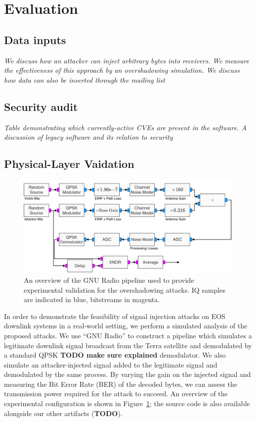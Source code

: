 \section{Evaluation}\label{sec:evaluation}

\subsection{Data inputs}

\textit{We discuss how an attacker can inject arbitrary bytes into receivers.  We measure the effectiveness of this approach by an overshadowing simulation.  We discuss how data can also be inserted through the mailing list}

\subsection{Security audit}
\textit{Table demonstrating which currently-active CVEs are present in the software. A discussion of legacy software and its relation to security}

\subsection{Physical-Layer Vaidation}

\begin{figure}
    \centering
    \includegraphics[width=\columnwidth]{diagrams/overshadowing_pipeline.pdf}
    \caption{An overview of the GNU Radio pipeline used to provide experimental validation for the overshadowing attacks. IQ samples are indicated in blue, bitstreams in magenta.}
    \label{fig:overshadowing_pipeline}
\end{figure}

In order to demonstrate the feasibility of signal injection attacks on EOS downlink systems in a real-world setting, we perform a simulated analysis of the proposed attacks.
We use ``GNU Radio'' to construct a pipeline which simulates a legitimate downlink signal broadcast from the Terra satellite and demodulated by a standard QPSK \textbf{TODO make sure explained} demodulator.
We also simulate an attacker-injected signal added to the legitimate signal and demodulated by the same process.
By varying the gain on the injected signal and measuring the Bit Error Rate (BER) of the decoded bytes, we can assess the transmission power required for the attack to succeed.
An overview of the experimental configuration is shown in Figure~\ref{fig:overshadowing_pipeline}; the source code is also available alongside our other artifacts (\textbf{TODO}).

